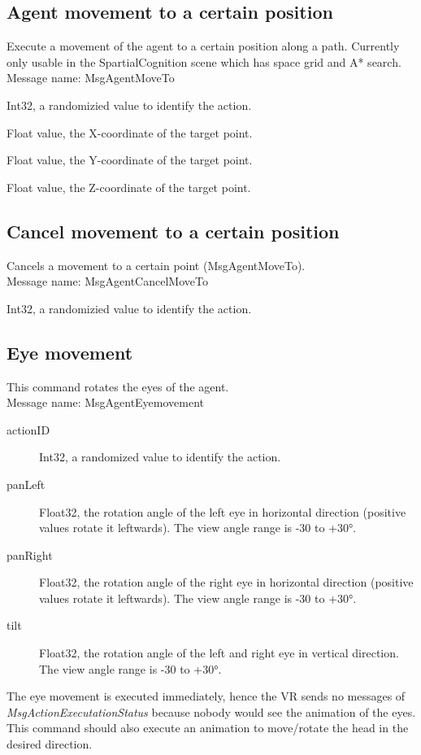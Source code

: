 \documentclass[a4paper,10pt]{scrartcl}
\begin{document}
\subsection{Agent movement to a certain position}
Execute a movement of the agent to a certain position along a path. Currently only usable in the SpartialCognition scene which has space grid and A* search.\\
Message name: MsgAgentMoveTo
\begin{description}
 \item [actionID] Int32, a randomizied value to identify the action.
 \item [x] Float value, the X-coordinate of the target point.
 \item [y] Float value, the Y-coordinate of the target point.
 \item [z] Float value, the Z-coordinate of the target point.
\item
\end{description}

\subsection{Cancel movement to a certain position}
Cancels a movement to a certain point (MsgAgentMoveTo).\\
Message name: MsgAgentCancelMoveTo
\begin{description}
 \item [actionID] Int32, a randomizied value to identify the action.
\item
\end{description}

\subsection{Eye movement}
This command rotates the eyes of the agent.\\
Message name: MsgAgentEyemovement
\begin{description}
 \item [actionID] Int32, a randomized value to identify the action.
 \item [panLeft] Float32, the rotation angle of the left eye in horizontal direction (positive values rotate it leftwards). The view angle range is -30 to +30°.
 \item [panRight] Float32, the rotation angle of the right eye in horizontal direction (positive values rotate it leftwards). The view angle range is -30 to +30°.
 \item [tilt] Float32, the rotation angle of the left and right eye in vertical direction. The view angle range is -30 to +30°.
\end{description}
The eye movement is executed immediately, hence the VR sends no messages of  \emph{MsgActionExecutationStatus} because nobody would see the animation of the eyes. This command should also execute an animation to move/rotate the head in the desired direction.
\end{document}
